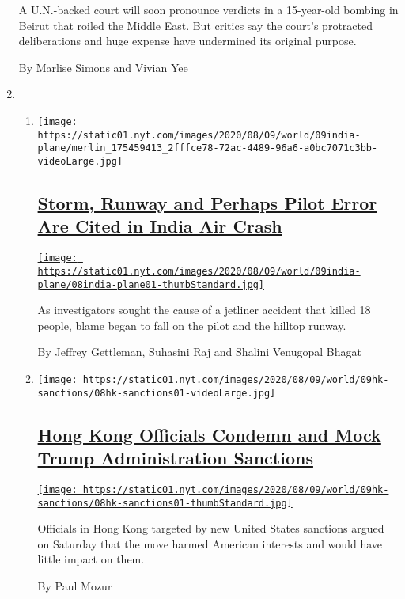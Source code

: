 \begin{enumerate}
  A U.N.-backed court will soon pronounce verdicts in a 15-year-old
  bombing in Beirut that roiled the Middle East. But critics say the
  court's protracted deliberations and huge expense have undermined its
  original purpose.

  By Marlise Simons and Vivian Yee
\item
  \begin{enumerate}
  \def\labelenumii{\arabic{enumii}.}
  \item
    \texttt{[image: https://static01.nyt.com/images/2020/08/09/world/09india-plane/merlin\_175459413\_2fffce78-72ac-4489-96a6-a0bc7071c3bb-videoLarge.jpg]}

    \hypertarget{storm-runway-and-perhaps-pilot-error-are-cited-in-india-air-crash}{%
    \subsection{\texorpdfstring{\href{/2020/08/08/world/asia/india-plane-crash-dubai.html}{Storm,
    Runway and Perhaps Pilot Error Are Cited in India Air
    Crash}}{Storm, Runway and Perhaps Pilot Error Are Cited in India Air Crash}}\label{storm-runway-and-perhaps-pilot-error-are-cited-in-india-air-crash}}

    \href{/2020/08/08/world/asia/india-plane-crash-dubai.html}{\texttt{[image: https://static01.nyt.com/images/2020/08/09/world/09india-plane/08india-plane01-thumbStandard.jpg]}}

    As investigators sought the cause of a jetliner accident that killed
    18 people, blame began to fall on the pilot and the hilltop runway.

    By Jeffrey Gettleman, Suhasini Raj and Shalini Venugopal Bhagat
  \item
    \texttt{[image: https://static01.nyt.com/images/2020/08/09/world/09hk-sanctions/08hk-sanctions01-videoLarge.jpg]}

    \hypertarget{hong-kong-officials-condemn-and-mock-trump-administration-sanctions}{%
    \subsection{\texorpdfstring{\href{/2020/08/08/world/asia/hong-kong-sanctions-united-states.html}{Hong
    Kong Officials Condemn and Mock Trump Administration
    Sanctions}}{Hong Kong Officials Condemn and Mock Trump Administration Sanctions}}\label{hong-kong-officials-condemn-and-mock-trump-administration-sanctions}}

    \href{/2020/08/08/world/asia/hong-kong-sanctions-united-states.html}{\texttt{[image: https://static01.nyt.com/images/2020/08/09/world/09hk-sanctions/08hk-sanctions01-thumbStandard.jpg]}}

    Officials in Hong Kong targeted by new United States sanctions
    argued on Saturday that the move harmed American interests and would
    have little impact on them.

    By Paul Mozur
  \end{enumerate}
\end{enumerate}

